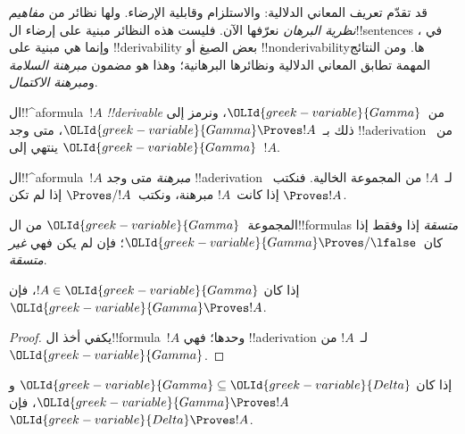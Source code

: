 \documentclass[../../../include/open-logic-section]{subfiles}
\begin{document}
      {}
      {}


\begin{explain}
قد تقدّم تعريف المعاني الدلالية:
 والاستلزام وقابلية الإرضاء.
ولها نظائر من \emph{مفاهيم نظرية البرهان} نعرّفها الآن.
فليست هذه النظائر مبنية على إرضاء ال!!{sentence}s في
، وإنما هي مبنية على
!!{derivability} بعض الصيغ أو !!{nonderivability}ها.
ومن النتائج المهمة تطابق المعاني الدلالية ونظائرها البرهانية؛
وهذا هو مضمون \emph{مبرهنة السلامة} و\emph{مبرهنة الاكتمال}.
\end{explain}

\begin{defn}[!!^{derivability}]
ال!!^a{formula}~$!A$ \emph{!!{derivable}} من~${\OLId{greek-variable}{Gamma}}$،
ونرمز إلى ذلك بـ~${\OLId{greek-variable}{Gamma}} \Proves !A$، متى وجد !!a{derivation}
من~${\OLId{greek-variable}{Gamma}}$ ينتهي إلى~$!A$.
\end{defn}

\begin{defn}[المبرهنات]
ال!!^a{formula}~$!A$ \emph{مبرهنة} متى وجد !!a{derivation}
لـ~$!A$ من المجموعة الخالية. فنكتب~$\Proves !A$ إذا كانت~$!A$
مبرهنة، ونكتب~$\Proves/ !A$ إذا لم تكن.
\end{defn}

\begin{defn}[الاتساق]
المجموعة~${\OLId{greek-variable}{Gamma}}$ من ال!!{formula}s \emph{متسقة} إذا وفقط إذا
كان~${\OLId{greek-variable}{Gamma}}\Proves/ \lfalse$؛ فإن لم يكن فهي \emph{غير متسقة}.
\end{defn}

\begin{prop}[الانعكاسية]
إذا كان $!A \in {\OLId{greek-variable}{Gamma}}$، فإن ${\OLId{greek-variable}{Gamma}} \Proves !A$.
\end{prop}

\begin{proof}
  يكفي أخذ ال!!{formula}~$!A$ وحدها؛ فهي !!a{derivation}
  لـ~$!A$ من~${\OLId{greek-variable}{Gamma}}$.
\end{proof}

\begin{prop}[الرتابة]
إذا كان ${\OLId{greek-variable}{Gamma}} \subseteq {\OLId{greek-variable}{Delta}}$ و${\OLId{greek-variable}{Gamma}} \Proves !A$، فإن ${\OLId{greek-variable}{Delta}}
\Proves !A$.
\end{prop}
\end{document}
